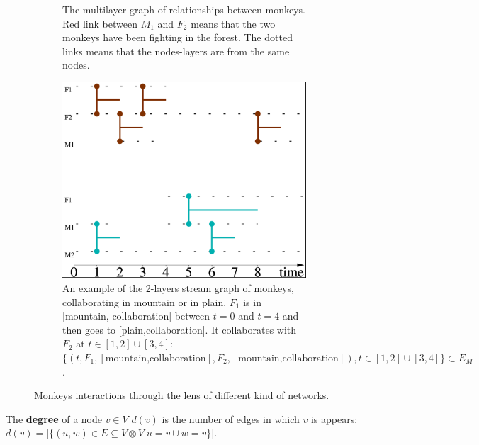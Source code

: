 \documentclass{svproc}
\begin{document}
\begin{figure}
\begin{subfigure}[b]{.45\textwidth}
			\caption{The multilayer graph of relationships between monkeys. Red link between $M_1$ and $F_2$ means that the two monkeys have been fighting in the forest. The dotted links means that the nodes-layers are from the same nodes.}
			\label{subfig:monkeyplex}
    \end{subfigure}
		\hfill
    \begin{subfigure}[b]{0.45\textwidth}
    	\includegraphics[width=\textwidth]{img/test}
    	\caption{An example of the 2-layers stream graph of monkeys, collaborating in mountain or in plain. $F_1$ is in [mountain, collaboration] between $t=0$ and $t=4$ and then goes to [plain,collaboration]. It collaborates with $F_2$ at $t\in [1,2]\cup[3,4]$: $\{(t,F_1,[\text{mountain,collaboration}],F_2,[\text{mountain,collaboration}]),t\in [1,2]\cup[3,4]\} \subset E_M$.}
    	\label{subfig:monkeymls}
    \end{subfigure}
    \caption{Monkeys interactions through the lens of different kind of networks.}\label{fig:monkey}
\end{figure}


The {\bf degree} of a node $v\in V$ $d(v)$ is the number of edges in which $v$ is appears: $d(v)=|\{(u,w) \in E \subseteq V \otimes V| u=v \cup w=v\}|$.
\end{document}
